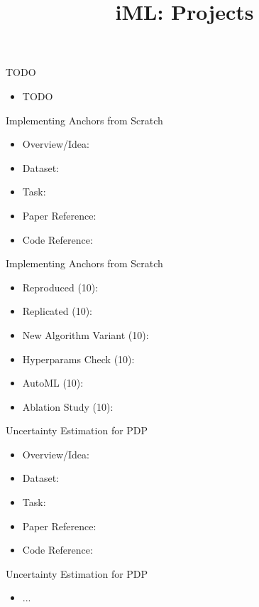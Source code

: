 \documentclass[aspectratio=169]{../latex_main/tntbeamer}  %
\title[Conclusion]{iML: Projects}
\subtitle{}
\begin{document}
	
	\maketitle


\begin{frame}[c]{TODO}
 
	\begin{itemize}
		\item TODO
	\end{itemize}
\end{frame}




	
\begin{frame}[c]{Implementing Anchors from Scratch}
	\begin{itemize}
		\item Overview/Idea:
		\item Dataset:
		\item Task:
		\item Paper Reference:
		\item Code Reference:
	\end{itemize}
\end{frame}

\begin{frame}[c]{Implementing Anchors from Scratch}
	\begin{itemize}
		\item Reproduced (10):
		\item Replicated (10):
		\item New Algorithm Variant (10):
		\item Hyperparams Check (10):
		\item AutoML (10):
		\item Ablation Study (10):
	\end{itemize}
\end{frame}


\begin{frame}[c]{Uncertainty Estimation for PDP}
	\begin{itemize}
		\item Overview/Idea:
		\item Dataset:
		\item Task:
		\item Paper Reference:
		\item Code Reference:
	\end{itemize}
\end{frame}

\begin{frame}[c]{Uncertainty Estimation for PDP}
	\begin{itemize}
		\item ...
	\end{itemize}
\end{frame}
	
	
\end{document}
